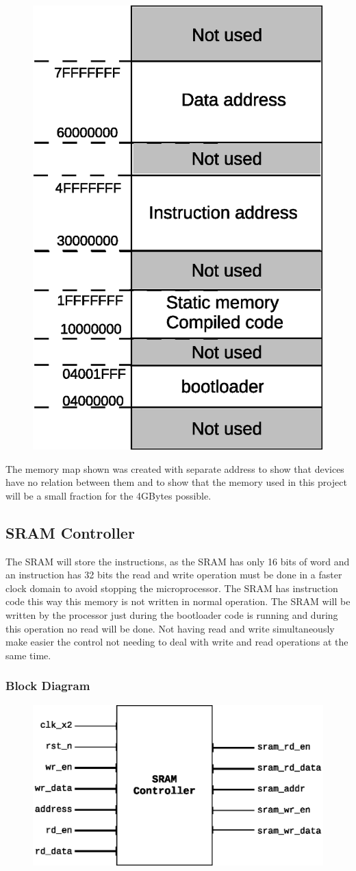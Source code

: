 \documentclass{article}
\begin{document}
  \begin{figure}[H]
    \centering
    \includegraphics[width=0.4\linewidth]{pictures/mem_dev_interface.eps}
  \end{figure} 

The memory map shown was created with separate address to show that devices have no relation between them and to show that the memory used in this project will be a small fraction for the 4GBytes possible.

\newpage
  \subsection{SRAM Controller}
  The SRAM will store the instructions, as the SRAM has only 16 bits of word and an instruction has 32 bits the read and write operation must be done in a faster clock domain to avoid stopping the microprocessor.  
  The SRAM has instruction code this way this memory is not written in normal operation. The SRAM will be written by the processor just during the bootloader code is running and during this operation no read will be done. Not having read and write simultaneously make easier the control not needing to deal with write and read operations at the same time.
    \subsubsection{Block Diagram}
  \begin{figure}[H]
    \centering
    \includegraphics[width=.8\linewidth]{pictures/blocks/sram_block.eps}
  \end{figure}  
\end{document}
